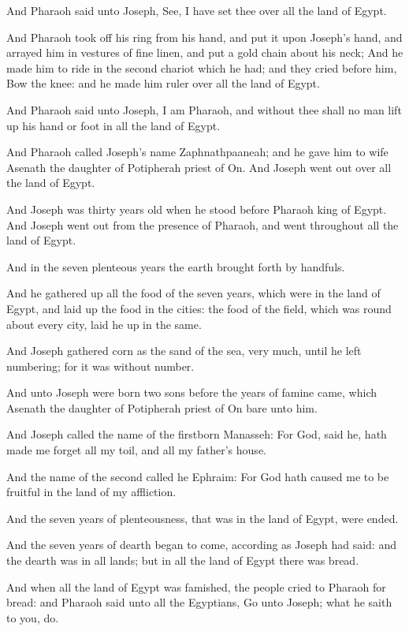\verse And Pharaoh said unto Joseph, See, I have set thee over all the land of Egypt.

\verse And Pharaoh took off his ring from his hand, and put it upon Joseph's hand, and arrayed him in vestures of fine linen, and put a gold chain about his neck; \verse And he made him to ride in the second chariot which he had; and they cried before him, Bow the knee: and he made him ruler over all the land of Egypt.

\verse And Pharaoh said unto Joseph, I am Pharaoh, and without thee shall no man lift up his hand or foot in all the land of Egypt.

\verse And Pharaoh called Joseph's name Zaphnathpaaneah; and he gave him to wife Asenath the daughter of Potipherah priest of On. And Joseph went out over all the land of Egypt.

\verse And Joseph was thirty years old when he stood before Pharaoh king of Egypt. And Joseph went out from the presence of Pharaoh, and went throughout all the land of Egypt.

\verse And in the seven plenteous years the earth brought forth by handfuls.

\verse And he gathered up all the food of the seven years, which were in the land of Egypt, and laid up the food in the cities: the food of the field, which was round about every city, laid he up in the same.

\verse And Joseph gathered corn as the sand of the sea, very much, until he left numbering; for it was without number.

\verse And unto Joseph were born two sons before the years of famine came, which Asenath the daughter of Potipherah priest of On bare unto him.

\verse And Joseph called the name of the firstborn Manasseh: For God, said he, hath made me forget all my toil, and all my father's house.

\verse And the name of the second called he Ephraim: For God hath caused me to be fruitful in the land of my affliction.

\verse And the seven years of plenteousness, that was in the land of Egypt, were ended.

\verse And the seven years of dearth began to come, according as Joseph had said: and the dearth was in all lands; but in all the land of Egypt there was bread.

\verse And when all the land of Egypt was famished, the people cried to Pharaoh for bread: and Pharaoh said unto all the Egyptians, Go unto Joseph; what he saith to you, do.

